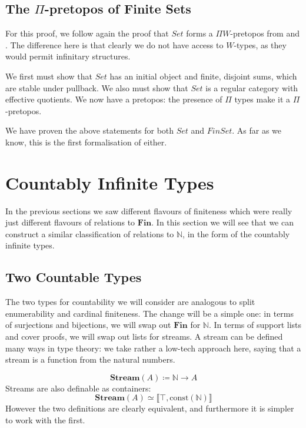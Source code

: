 \subsection{The \(\Pi\)-pretopos of Finite Sets}
For this proof, we follow again the proof that \(\mathit{Set}\) forms a \(\Pi
W\)-pretopos from \cite[chapter 10]{hottbook} and
\cite{rijkeSetsHomotopyType2015}.
The difference here is that clearly we do not have access to \(W\)-types, as
they would permit infinitary structures.

We first must show that \(\mathit{Set}\) has an initial object and finite,
disjoint sums, which are stable under pullback.
We also must show that \(\mathit{Set}\) is a regular category with effective
quotients.
We now have a pretopos: the presence of \(\Pi\) types make it a
\(\Pi\)-pretopos.

We have proven the above statements for both \(\mathit{Set}\) and
\(\mathit{FinSet}\).
As far as we know, this is the first formalisation of either.
\section{Countably Infinite Types}
In the previous sections we saw different flavours of finiteness which were
really just different flavours of relations to \(\mathbf{Fin}\).
In this section we will see that we can construct a similar classification of
relations to \(\mathbb{N}\), in the form of the countably infinite types.
\subsection{Two Countable Types}
The two types for countability we will consider are analogous to split
enumerability and cardinal finiteness.
The change will be a simple one: in terms of surjections and bijections, we will
swap out \(\mathbf{Fin}\) for \(\mathbb{N}\).
In terms of support lists and cover proofs, we will swap out lists for streams.
A stream can be defined many ways in type theory: we take rather a low-tech
approach here, saying that a stream is a function from the natural numbers.
\begin{romdefinition}[Stream]
  \begin{equation}
    \mathbf{Stream}(A) \coloneqq \mathbb{N} \rightarrow A
  \end{equation}
  Streams are also definable as containers:
  \begin{equation}
    \mathbf{Stream}(A) \simeq \llbracket \top , \text{const}(\mathbb{N}) \rrbracket
  \end{equation}
  However the two definitions are clearly equivalent, and furthermore it is
  simpler to work with the first.
\end{romdefinition}

